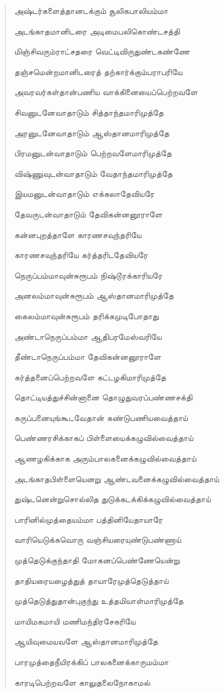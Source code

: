 \documentclass{article}
\begin{document}
\begin{quotation}
{அஷ்டர்களைத்தானடக்கும் சூலிகபாலியம்மா

அடங்காதமானிடரை அடிமைபலிகொண்டசத்தி

மிஞ்சிவரும்ராட்சதரை வெட்டிவிருதுண்டகண்ணே

தஞ்சமென்றமானிடரைத் தற்கார்க்கும்பராபரியே

அவரவர்கள்தான்பணிய வாக்கினையைப்பெற்றவளே

சிவனுடனேவாதாடும் சித்தாந்தமாரிமுத்தே

அரனுடனேவாதாடும் ஆஸ்தானமாரிமுத்தே

பிரமனுடன்வாதாடும் பெற்றவளேமாரிமுத்தே

விஷ்ணுவுடன்வாதாடும் வேதாந்தமாரிமுத்தே

இயமனுடன்வாதாடும் எக்கலாதேவியரே

தேவருடன்வாதாடும் தேவிகன்னனூராளே

கன்னபுறத்தாளே காரணசவுந்தரியே

காரணசவுந்தரியே கர்த்தரிடதேவியரே

நெருப்பம்மாவுன்சுரூபம் நிஷ்டூரக்காரியரே

அனலம்மாவுன்சுரூபம் ஆஸ்தானமாரிமுத்தே

கைலம்மாவுன்சுரூபம் தரிக்கமுடிபோதாது

அண்டாநெருப்பம்மா ஆதிபரமேஸ்வரியே

தீண்டாநெருப்பம்மா தேவிகன்னனூராளே

கர்த்தனைப்பெற்றவளே கட்டழகிமாரிமுத்தே

தொட்டியத்துச்சின்னானை தொழுதுவரப்பண்ணசக்தி

கருப்பனையுங்கூடவேதான் கண்டுபணியவைத்தாய்

பெண்ணரசிக்காகப் பிள்ளையைக்கழுவில்வைத்தாய்

ஆணழகிக்காக அரும்பாலகனைக்கழுவில்வைத்தாய்

அடங்காதபிள்ளையெனறு ஆண்டவனைக்கழுவில்வைத்தாய்

துஷ்டனென்றுசொல்லித துடுக்கடக்கிக்கழுவில்வைத்தாய்

பாரினில்முத்தையம்மா பத்தினியேதாயாரே

வாரியெடுக்கவொரு வஞ்சியரையுண்டுபண்ணாய்

முத்தெடுக்குந்தாதி மோகனப்பெண்ணேயென்று

தாதியரையழைத்துத் தாயாரேமுத்தெடுத்தாய்

முத்தெடுத்துதான்புகுந்து உத்தமியாள்மாரிமுத்தே

மாயிமகமாயி மணிமந்திரசேகரியே

ஆயிவுமையவளே ஆஸ்தானமாரிமுத்தே

பாரமுத்தைநீயிரக்கிப் பாலகனைக்காருமம்மா

காரடிபெற்றவளே காலுதலைநோகாமல்

}
\end{quotation}
\end{document}
